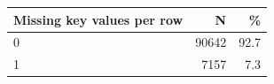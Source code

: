 \begin{threeparttable}


\begin{tabular}{@{}lrr@{}}


\toprule


\textbf{Missing key values per row} & \textbf{N} & \textbf{\%} \\


\midrule


\midrule
0           &       90642&        92.7\\
1           &        7157&         7.3\\
\bottomrule


\end{tabular}


\end{threeparttable}
